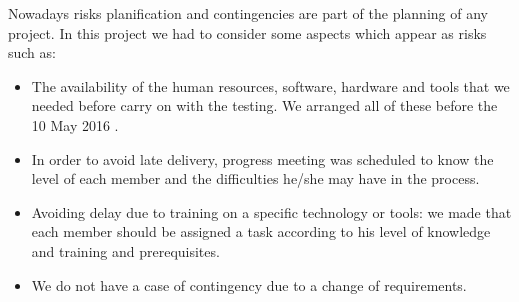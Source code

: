 Nowadays risks planification and contingencies are part of the planning of any project. In this project we had to consider some aspects which appear as risks such as: 

\begin{itemize}
 
     \item  The availability of the human resources, software, hardware and tools that we needed before carry on with the testing. We arranged all of these before the 10 May 2016 . 

      \item In order to avoid late delivery, progress meeting was scheduled to know the level of each member and the difficulties he/she may have in the process.

      \item Avoiding delay due to training on a specific technology or tools: we made that each member should be assigned a task according to his level of knowledge and training and prerequisites.     

       \item We do not have a case of contingency due to a change of requirements. 

\end{itemize}                        
